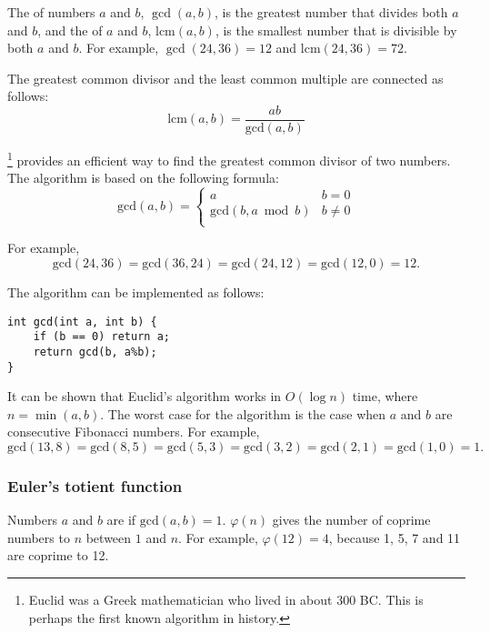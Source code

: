 
The  of
numbers $a$ and $b$, $\gcd(a,b)$,
is the greatest number that divides both $a$ and $b$,
and the  of
$a$ and $b$, $\textrm{lcm}(a,b)$,
is the smallest number that is divisible by
both $a$ and $b$.
For example,
$\gcd(24,36)=12$ and
$\textrm{lcm}(24,36)=72$.

The greatest common divisor and the least common multiple
are connected as follows:
\[\textrm{lcm}(a,b)=\frac{ab}{\textrm{gcd}(a,b)}\]

\footnote{Euclid was a Greek mathematician who
lived in about 300 BC. This is perhaps the first known algorithm in history.} provides an efficient way
to find the greatest common divisor of two numbers.
The algorithm is based on the following formula:
\begin{equation*}
    \textrm{gcd}(a,b) = \begin{cases}
               a        & b = 0\\
               \textrm{gcd}(b,a \bmod b) & b \neq 0\\
           \end{cases}
\end{equation*}

For example,
\[\textrm{gcd}(24,36) = \textrm{gcd}(36,24)
= \textrm{gcd}(24,12) = \textrm{gcd}(12,0)=12.\]

The algorithm can be implemented as follows:
\begin{lstlisting}
int gcd(int a, int b) {
    if (b == 0) return a;
    return gcd(b, a%b);
}
\end{lstlisting}

It can be shown that Euclid's algorithm works
in $O(\log n)$ time, where $n=\min(a,b)$.
The worst case for the algorithm is
the case when $a$ and $b$ are consecutive Fibonacci numbers.
For example,
\[\textrm{gcd}(13,8)=\textrm{gcd}(8,5)
=\textrm{gcd}(5,3)=\textrm{gcd}(3,2)=\textrm{gcd}(2,1)=\textrm{gcd}(1,0)=1.\]

\subsubsection{Euler's totient function}


Numbers $a$ and $b$ are 
if $\textrm{gcd}(a,b)=1$.
 $\varphi(n)$
gives the number of coprime numbers to $n$
between $1$ and $n$.
For example, $\varphi(12)=4$,
because 1, 5, 7 and 11
are coprime to 12.

